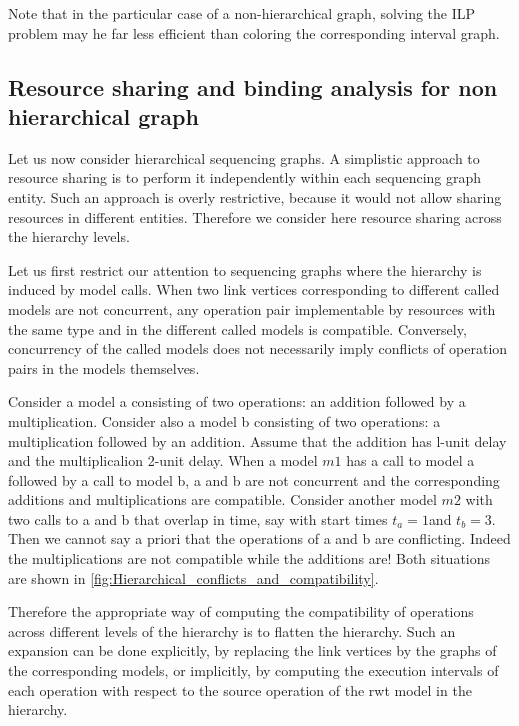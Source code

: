 Note that in the particular case of a non-hierarchical graph, solving the ILP problem may he far less efficient than coloring the corresponding interval graph.


\subsection{Resource sharing and binding analysis for non hierarchical graph}

Let us now consider hierarchical sequencing graphs. A simplistic approach to resource sharing is to perform it independently within each sequencing graph entity. Such an approach is overly restrictive, because it would not allow sharing resources in different entities. Therefore we consider here resource sharing across the hierarchy levels. 

Let us first restrict our attention to sequencing graphs where the hierarchy is induced by model calls. When two link vertices corresponding to different called models are not concurrent, any operation pair implementable by resources with the same type and in the different called models is compatible. Conversely, concurrency of the called models does not necessarily imply conflicts of operation pairs in the models themselves.

Consider a model a consisting of two operations: an addition followed by a multiplication. Consider also a model b consisting of two operations: a multiplication followed by an addition. Assume that the addition has l-unit delay and the multiplicalion 2-unit delay. When a model $ m1 $ has a call to model a followed by a call to model b, a and b are not concurrent and the corresponding additions and multiplications are compatible. 
Consider another model $ m2 $ with two calls to a and b that overlap in time, say with start times $ t_{a}=1 $and $ t_{b}=3 $. Then we cannot say a priori that the operations of a and b are conflicting. Indeed the multiplications are not compatible while the additions are! Both situations are shown in \ref{fig:Hierarchical_conflicts_and_compatibility}. 

Therefore the appropriate way of computing the compatibility of operations across different levels of the hierarchy is to flatten the hierarchy. Such an expansion can be done explicitly, by replacing the link vertices by the graphs of the corresponding models, or implicitly, by computing the execution intervals of each operation with respect to the source operation of the rwt model in the hierarchy. 

